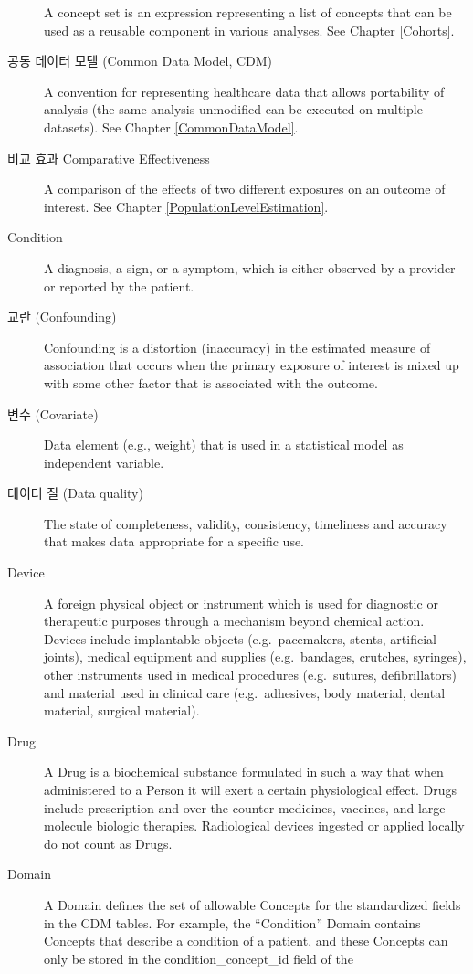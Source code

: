 \documentclass[11pt]{book}
\theoremstyle{definition}
\theoremstyle{definition}
\theoremstyle{definition}
\theoremstyle{remark}
\begin{document}
\begin{description}
A concept set is an expression representing a list of concepts that can
be used as a reusable component in various analyses. See Chapter
\ref{Cohorts}.
\item[공통 데이터 모델 (Common Data Model, CDM)]
A convention for representing healthcare data that allows portability of
analysis (the same analysis unmodified can be executed on multiple
datasets). See Chapter \ref{CommonDataModel}.
\item[비교 효과 Comparative Effectiveness]
A comparison of the effects of two different exposures on an outcome of
interest. See Chapter \ref{PopulationLevelEstimation}.
\item[Condition]
A diagnosis, a sign, or a symptom, which is either observed by a
provider or reported by the patient.
\item[교란 (Confounding)]
Confounding is a distortion (inaccuracy) in the estimated measure of
association that occurs when the primary exposure of interest is mixed
up with some other factor that is associated with the outcome.
\item[변수 (Covariate)]
Data element (e.g., weight) that is used in a statistical model as
independent variable.
\item[데이터 질 (Data quality)]
The state of completeness, validity, consistency, timeliness and
accuracy that makes data appropriate for a specific use.
\item[Device]
A foreign physical object or instrument which is used for diagnostic or
therapeutic purposes through a mechanism beyond chemical action. Devices
include implantable objects (e.g.~pacemakers, stents, artificial
joints), medical equipment and supplies (e.g.~bandages, crutches,
syringes), other instruments used in medical procedures (e.g.~sutures,
defibrillators) and material used in clinical care (e.g.~adhesives, body
material, dental material, surgical material).
\item[Drug]
A Drug is a biochemical substance formulated in such a way that when
administered to a Person it will exert a certain physiological effect.
Drugs include prescription and over-the-counter medicines, vaccines, and
large-molecule biologic therapies. Radiological devices ingested or
applied locally do not count as Drugs.
\item[Domain]
A Domain defines the set of allowable Concepts for the standardized
fields in the CDM tables. For example, the ``Condition'' Domain contains
Concepts that describe a condition of a patient, and these Concepts can
only be stored in the condition\_concept\_id field of the

\end{description}
\end{document}

